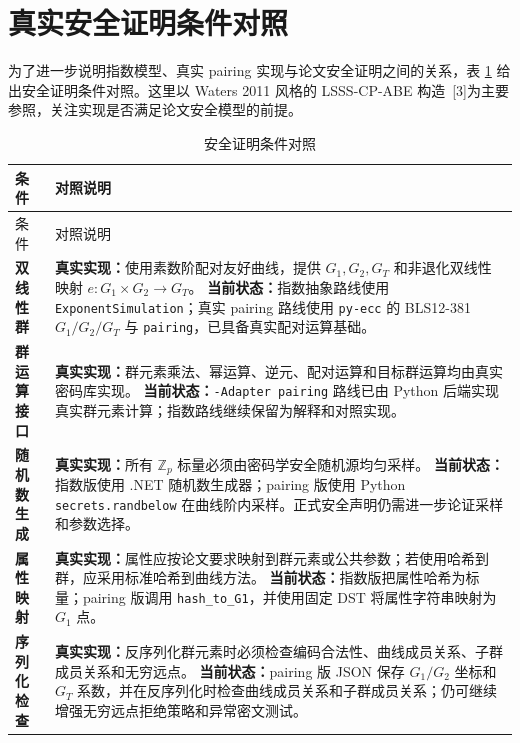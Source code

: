 \section{真实安全证明条件对照}

为了进一步说明指数模型、真实 pairing 实现与论文安全证明之间的关系，表 \ref{tab:security-proof-conditions} 给出安全证明条件对照。这里以 Waters 2011 风格的 LSSS-CP-ABE 构造~[3]为主要参照，关注实现是否满足论文安全模型的前提。

\begingroup
\renewcommand{\arraystretch}{1.18}
\begin{longtable}{>{\raggedright\arraybackslash}p{} >{\raggedright\arraybackslash}p{}}
\caption{安全证明条件对照}
\label{tab:security-proof-conditions}\\
\toprule
条件 & 对照说明 \\
\midrule
\endfirsthead
\toprule
条件 & 对照说明 \\
\midrule
\endhead
\textbf{双线性群} &
\textbf{真实实现：}使用素数阶配对友好曲线，提供 $G_1,G_2,G_T$ 和非退化双线性映射 $e:G_1\times G_2\rightarrow G_T$。\newline
\textbf{当前状态：}指数抽象路线使用 \texttt{ExponentSimulation}；真实 pairing 路线使用 \texttt{py-ecc} 的 BLS12-381 $G_1/G_2/G_T$ 与 \texttt{pairing}，已具备真实配对运算基础。\\[0.45em]
\textbf{群运算接口} &
\textbf{真实实现：}群元素乘法、幂运算、逆元、配对运算和目标群运算均由真实密码库实现。\newline
\textbf{当前状态：}\texttt{-Adapter pairing} 路线已由 Python 后端实现真实群元素计算；指数路线继续保留为解释和对照实现。\\[0.45em]
\textbf{随机数生成} &
\textbf{真实实现：}所有 $\mathbb{Z}_p$ 标量必须由密码学安全随机源均匀采样。\newline
\textbf{当前状态：}指数版使用 .NET 随机数生成器；pairing 版使用 Python \texttt{secrets.randbelow} 在曲线阶内采样。正式安全声明仍需进一步论证采样和参数选择。\\[0.45em]
\textbf{属性映射} &
\textbf{真实实现：}属性应按论文要求映射到群元素或公共参数；若使用哈希到群，应采用标准哈希到曲线方法。\newline
\textbf{当前状态：}指数版把属性哈希为标量；pairing 版调用 \texttt{hash\_to\_G1}，并使用固定 DST 将属性字符串映射为 $G_1$ 点。\\[0.45em]
\textbf{序列化检查} &
\textbf{真实实现：}反序列化群元素时必须检查编码合法性、曲线成员关系、子群成员关系和无穷远点。\newline
\textbf{当前状态：}pairing 版 JSON 保存 $G_1/G_2$ 坐标和 $G_T$ 系数，并在反序列化时检查曲线成员关系和子群成员关系；仍可继续增强无穷远点拒绝策略和异常密文测试。\\[0.45em]

\end{longtable}
